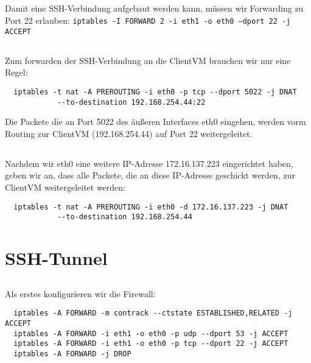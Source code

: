 \documentclass{scrartcl}
\begin{document}
\begin{enumerate}[\bfseries 1.]
\subsection{}
\label{sub:3.4}
Damit eine SSH-Verbindung aufgebaut werden kann, müssen wir Forwarding zu Port
22 erlauben: \texttt{iptables -I FORWARD 2 -i eth1 -o eth0 --dport 22 -j ACCEPT}

\subsection{}
\label{sub:3.5}
Zum forwarden der SSH-Verbindung an die ClientVM brauchen wir nur eine Regel:
\begin{lstlisting}
  iptables -t nat -A PREROUTING -i eth0 -p tcp --dport 5022 -j DNAT
            --to-destination 192.168.254.44:22
\end{lstlisting}
Die Packete die an Port 5022 des äußeren Interfaces eth0 eingehen, werden vorm
Routing zur ClientVM (192.168.254.44) auf Port 22 weitergeleitet.

\subsection{}
\label{sub:3.6}
Nachdem wir eth0 eine weitere IP-Adresse 172.16.137.223 eingerichtet haben,
geben wir an, dass alle Packete, die an diese IP-Adresse geschickt werden,
zur ClientVM weitergeleitet werden:
\begin{lstlisting}
  iptables -t nat -A PREROUTING -i eth0 -d 172.16.137.223 -j DNAT
            --to-destination 192.168.254.44
\end{lstlisting}

\section{SSH-Tunnel}
\label{sec:SSH-Tunnel}
\subsection{}
\label{sub:4.1}
Als erstes konfigurieren wir die Firewall:
\begin{lstlisting}
  iptables -A FORWARD -m contrack --ctstate ESTABLISHED,RELATED -j ACCEPT
  iptables -A FORWARD -i eth1 -o eth0 -p udp --dport 53 -j ACCEPT
  iptables -A FORWARD -i eth1 -o eth0 -p tcp --dport 22 -j ACCEPT
  iptables -A FORWARD -j DROP
\end{lstlisting}


\end{enumerate}
\end{document}
